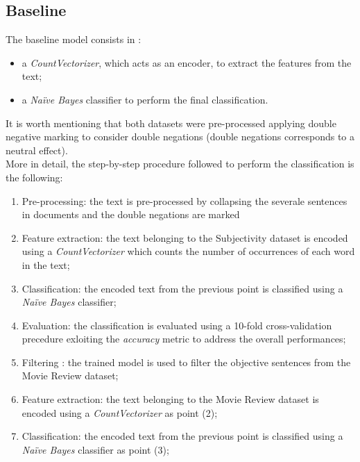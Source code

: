 \subsection{Baseline}
The baseline model consists in :
\begin{itemize}
    \item a \textit{CountVectorizer}\cite{vectorizer}, which acts as an encoder, to extract the features from the text;
    \item a \textit{Na\"{i}ve Bayes}\cite{naive} classifier to perform the final classification.
\end{itemize}
It is worth mentioning that both datasets were pre-processed applying double negative marking to consider double negations (double negations corresponds to a neutral effect).\\
More in detail, the step-by-step procedure followed to perform the classification is the following:
\begin{enumerate}
    \item Pre-processing: the text is pre-processed by collapsing the severale sentences in documents and the double negations are marked
    \item Feature extraction: the text belonging to the Subjectivity dataset is encoded using a \textit{CountVectorizer} which counts the number of occurrences of each word in the text;
    \item Classification: the encoded text from the previous point is classified using a \textit{Na\"{i}ve Bayes} classifier;
    \item Evaluation: the classification is evaluated using a 10-fold cross-validation precedure exloiting the \textit{accuracy} metric to address the overall performances;
    \item Filtering : the trained model is used to filter the objective sentences from the Movie Review dataset;    
    \item Feature extraction: the text belonging to the Movie Review dataset is encoded using a \textit{CountVectorizer} as point (2);
    \item Classification: the encoded text from the previous point is classified using a \textit{Na\"{i}ve Bayes} classifier as point (3);
\end{enumerate}
